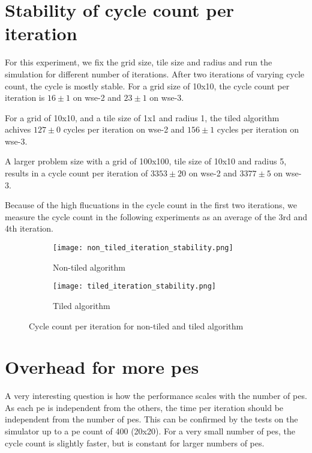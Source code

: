 \section{Stability of cycle count per iteration}
For this experiment, we fix the grid size, tile size and radius and run the simulation for different number of iterations.
After two iterations of varying cycle count, the cycle is mostly stable.
For a grid size of 10x10, the cycle count per iteration is $16\pm1$ on \ac{wse}-2 and $23\pm1$ on \ac{wse}-3.

For a grid of 10x10, and a tile size of 1x1 and radius 1, the tiled algorithm achives $127\pm0$ cycles per iteration on \ac{wse}-2 and $156\pm1$ cycles per iteration on \ac{wse}-3.

A larger problem size with a grid of 100x100, tile size of 10x10 and radius 5, results in a cycle count per iteration of $3353\pm20$ on \ac{wse}-2 and $3377\pm5$ on \ac{wse}-3.

Because of the high flucuations in the cycle count in the first two iterations, we measure the cycle count in the following experiments as an average of the 3rd and 4th iteration.

\begin{figure}[h]
    \centering
    \begin{subfigure}[b]{0.48\textwidth}
        \centering
        \texttt{[image: non\_tiled\_iteration\_stability.png]}
        \caption{Non-tiled algorithm}
        \label{fig:non_tiled_iteration_stability}
    \end{subfigure}
    \hfill
    \begin{subfigure}[b]{0.48\textwidth}
        \centering
        \texttt{[image: tiled\_iteration\_stability.png]}
        \caption{Tiled algorithm}
        \label{fig:tiled_iteration_stability}
    \end{subfigure}
    \caption{Cycle count per iteration for non-tiled and tiled algorithm}
    \label{fig:iteration_stability}
\end{figure}

\section{Overhead for more \acp{pe}}
A very interesting question is how the performance scales with the number of \acp{pe}.
As each \ac{pe} is independent from the others, the time per iteration should be independent from the number of \acp{pe}.
This can be confirmed by the tests on the simulator up to a \ac{pe} count of 400 (20x20).
For a very small number of \acp{pe}, the cycle count is slightly faster, but is constant for larger numbers of \acp{pe}.

